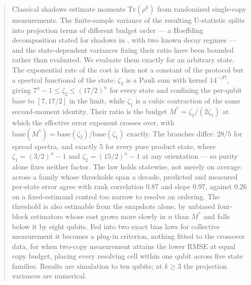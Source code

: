 \begin{abstract}
Classical shadows estimate moments \(\mathrm{Tr}(\rho^k)\) from randomized single-copy
measurements. The finite-sample variance of the resulting U-statistic splits into projection terms
of different budget order --- a Hoeffding decomposition \cite{hoeffding1948, serfling1980} stated
for shadows in \cite{huang2020shadows}, with two known decay regimes
\cite{elben2020mixed, aasen2026limitations} --- and the state-dependent variances fixing their
ratio have been bounded rather than evaluated. We evaluate them exactly for an arbitrary state.
The exponential rate of the cost is then not a constant of the protocol but a spectral functional
of the state: \(\zeta_2\) is a Pauli sum with kernel \(14^{-|P|}\), giving
\(7^n - 1 \le \zeta_2 \le (17/2)^n\) for every state and confining the per-qubit base to
\([7, 17/2]\) in the limit, while \(\zeta_1\) is a cubic contraction of the same second-moment
identity. Their ratio is the budget \(M^* = \zeta_2/(2\zeta_1)\) at which the effective error
exponent crosses over, with
\(\mathrm{base}(M^*) = \mathrm{base}(\zeta_2)/\mathrm{base}(\zeta_1)\) exactly. The branches
differ: \(28/5\) for spread spectra, and exactly \(5\) for every pure product state, where
\(\zeta_1 = (3/2)^n - 1\) and \(\zeta_2 = (15/2)^n - 1\) at any orientation --- so purity alone
fixes neither factor. The law holds statewise, not merely on average: across a family whose
thresholds span a decade, predicted and measured per-state error agree with rank correlation
\(0.87\) and slope \(0.97\), against \(0.26\) on a fixed-estimand control too narrow to resolve
an ordering. The threshold is also estimable from the snapshots alone, by unbiased four-block
estimators whose cost grows more slowly in \(n\) than \(M^*\) and falls below it by eight
qubits. Fed into two exact bias laws for collective measurement it becomes a plug-in criterion,
nothing fitted to the crossover data, for when two-copy measurement attains the lower RMSE at
equal copy budget, placing every resolving cell within one qubit across five state families.
Results are simulation to ten qubits; at \(k \ge 3\) the projection variances are numerical.
\end{abstract}
